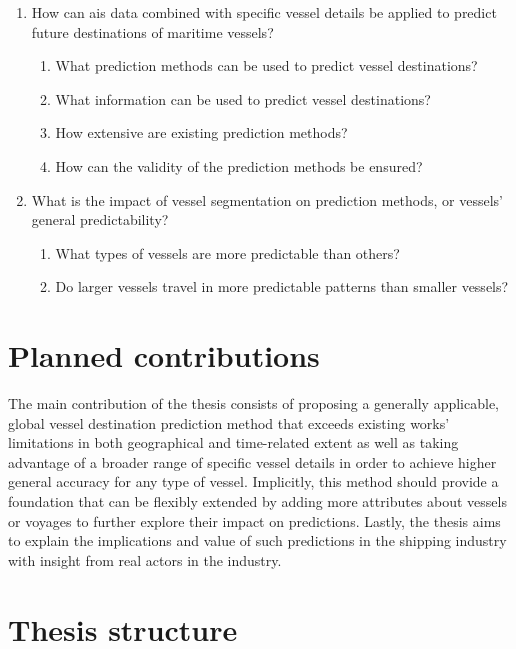 \begin{enumerate}
    \item How can \acrshort{ais} data combined with specific vessel details be applied to predict future destinations of maritime vessels?
    \begin{enumerate}
    \item What prediction methods can be used to predict vessel destinations?
    \item What information can be used to predict vessel destinations?
    \item How extensive are existing prediction methods?
    \item How can the validity of the prediction methods be ensured?
    \end{enumerate}
    \item What is the impact of vessel segmentation on prediction methods, or vessels' general predictability?
    \begin{enumerate}
    \item What types of vessels are more predictable than others?
    \item Do larger vessels travel in more predictable patterns than smaller vessels?
    \end{enumerate}
\end{enumerate}

\section{Planned contributions}

The main contribution of the thesis consists of proposing a generally applicable, global vessel destination prediction method that exceeds existing works' limitations in both geographical and time-related extent as well as taking advantage of a broader range of specific vessel details in order to achieve higher general accuracy for any type of vessel. Implicitly, this method should provide a foundation that can be flexibly extended by adding more attributes about vessels or voyages to further explore their impact on predictions. Lastly, the thesis aims to explain the implications and value of such predictions in the shipping industry with insight from real actors in the industry.

\section{Thesis structure}


